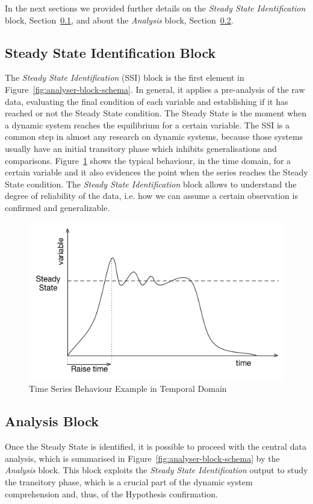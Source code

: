 In the next sections we provided further details on the \textit{Steady State Identification} block, Section~\ref{sec:analyser-ss-block}, and about the \textit{Analysis} block, Section~\ref{sec:analyser-analysis-block}. 

\subsection{Steady State Identification Block}\label{sec:analyser-ss-block}

The \textit{Steady State Identification} (SSI) block is the first element in Figure~\ref{fig:analyser-block-schema}. In general, it applies a pre-analysis of the raw data, evaluating the final condition of each variable and establishing if it has reached or not the Steady State condition. The Steady State is the moment when a dynamic system reaches the equilibrium for a certain variable. The SSI is a common step in almost any research on dynamic systems, because those systems usually have an initial transitory phase which inhibits generalisations and comparisons. Figure~\ref{fig:steady-state} shows the typical behaviour, in the time domain, for a certain variable and it also evidences the point when the series reaches the Steady State condition. The \textit{Steady State Identification} block allows to understand the degree of reliability of the data, i.e. how we can assume a certain observation is confirmed and generalizable.

\begin{figure}[h!]
  \centering
	\includegraphics[width=0.5\linewidth]{images/steady-state}
	\caption{Time Series Behaviour Example in Temporal Domain} 	
  	\label{fig:steady-state}
\end{figure}


\subsection{Analysis Block}\label{sec:analyser-analysis-block}

Once the Steady State is identified, it is possible to proceed with the central data analysis, which is summarised in Figure~\ref{fig:analyser-block-schema} by the \textit{Analysis} block. This block exploits the \textit{Steady State Identification} output to study the transitory phase, which is a crucial part of the dynamic system comprehension and, thus, of the Hypothesis confirmation.

